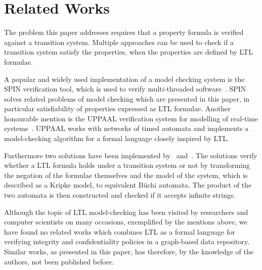 \section{Related Works}
The problem this paper addresses requires that a property formula is verified against a transition system. Multiple approaches can be used to check if a transition system satisfy the properties, when the properties are defined by LTL formulae.

A popular and widely used implementation of a model checking system is the SPIN verification tool, which is used to verify multi-threaded software~\cite{spin}. SPIN solves related problems of model checking which are presented in this paper, in particular satisfiability of properties expressed as LTL formulae. Another honourable mention is the UPPAAL verification system for modelling of real-time systems~\cite{uppaal}. UPPAAL works with networks of timed automata and implements a model-checking algorithm for a formal language closely inspired by LTL.

Furthermore two solutions have been implemented by~\cite{jpsember} and~\cite{serejke}. The solutions verify whether a LTL formula holds under a transition system or not by transforming the negation of the formulae themselves and the model of the system, which is described as a Kripke model, to equivalent Büchi automata. The product of the two automata is then constructed and checked if it accepts infinite strings.

Although the topic of LTL model-checking has been visited by researchers and computer scientists on many occasions, exemplified by the mentions above, we have found no related works which combines LTL as a formal language for verifying integrity and confidentiality policies in a graph-based data repository. Similar works, as presented in this paper, has therefore, by the knowledge of the authors, not been published before.

